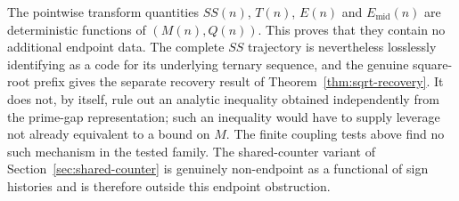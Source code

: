 \documentclass[11pt]{amsart}
\numberwithin{equation}{section}
\theoremstyle{plain}
\theoremstyle{definition}
\theoremstyle{remark}
\begin{document}
The pointwise transform quantities $SS(n)$, $T(n)$, $E(n)$ and
$E_{\mathrm{mid}}(n)$ are deterministic functions of $(M(n),Q(n))$. This proves
that they contain no additional endpoint data.  The complete $SS$ trajectory is
nevertheless losslessly identifying as a code for its underlying ternary
sequence, and the genuine square-root prefix gives the separate recovery result
of Theorem~\ref{thm:sqrt-recovery}. It does not, by itself, rule out an
analytic inequality obtained independently from the prime-gap representation; such an
inequality would have to supply leverage not already equivalent to a bound on $M$. The
finite coupling tests above find no such mechanism in the tested family. The shared-counter
variant of Section~\ref{sec:shared-counter} is genuinely non-endpoint as a functional
of sign histories and is therefore outside this endpoint obstruction.
\end{document}
